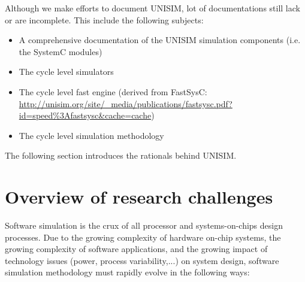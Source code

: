 Although we make efforts to document UNISIM, lot of documentations still lack or are incomplete. This include the following subjects:
\begin{itemize}
	\item A comprehensive documentation of the UNISIM simulation components (i.e. the SystemC modules)
	\item The cycle level simulators
	\item The cycle level fast engine (derived from FastSysC: \url{http://unisim.org/site/_media/publications/fastsysc.pdf?id=speed\%3Afastsysc&cache=cache})
	\item The cycle level simulation methodology
\end{itemize}

The following section introduces the rationals behind UNISIM.

\section{Overview of research challenges}

Software simulation is the crux of all processor and systems-on-chips design processes. Due to the growing complexity of hardware on-chip systems, the growing complexity of software applications, and the growing impact of technology issues (power, process variability,...) on system design, software simulation methodology must rapidly evolve in the following ways:

